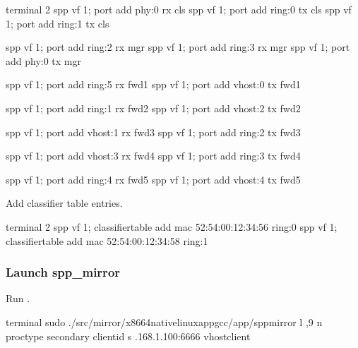 \documentclass[a4paper,11pt,openany,oneside,english]{sphinxmanual}
\begin{document}
\begin{sphinxVerbatim}[commandchars=\\\{\},formatcom=\footnotesize]
\PYGZsh{} terminal 2
spp \PYGZgt{} vf 1; port add phy:0 rx cls
spp \PYGZgt{} vf 1; port add ring:0 tx cls
spp \PYGZgt{} vf 1; port add ring:1 tx cls

spp \PYGZgt{} vf 1; port add ring:2 rx mgr
spp \PYGZgt{} vf 1; port add ring:3 rx mgr
spp \PYGZgt{} vf 1; port add phy:0 tx mgr

spp \PYGZgt{} vf 1; port add ring:5 rx fwd1
spp \PYGZgt{} vf 1; port add vhost:0 tx fwd1

spp \PYGZgt{} vf 1; port add ring:1 rx fwd2
spp \PYGZgt{} vf 1; port add vhost:2 tx fwd2

spp \PYGZgt{} vf 1; port add vhost:1 rx fwd3
spp \PYGZgt{} vf 1; port add ring:2 tx fwd3

spp \PYGZgt{} vf 1; port add vhost:3 rx fwd4
spp \PYGZgt{} vf 1; port add ring:3 tx fwd4

spp \PYGZgt{} vf 1; port add ring:4 rx fwd5
spp \PYGZgt{} vf 1; port add vhost:4 tx fwd5
\end{sphinxVerbatim}

Add classifier table entries.

\begin{sphinxVerbatim}[commandchars=\\\{\},formatcom=\footnotesize]
\PYGZsh{} terminal 2
spp \PYGZgt{} vf 1; classifier\PYGZus{}table add mac 52:54:00:12:34:56 ring:0
spp \PYGZgt{} vf 1; classifier\PYGZus{}table add mac 52:54:00:12:34:58 ring:1
\end{sphinxVerbatim}


\subsubsection{Launch spp\_mirror}
\label{\detokenize{usecases/spp_mirror:id2}}
Run .

\begin{sphinxVerbatim}[commandchars=\\\{\},formatcom=\footnotesize]
 terminal 
 sudo ./src/mirror/x86\PYGZus{}64\PYGZhy{}native\PYGZhy{}linuxapp\PYGZhy{}gcc/app/spp\PYGZus{}mirror 
  \PYGZhy{}l ,9 
  \PYGZhy{}n  \PYGZhy{}\PYGZhy{}proc\PYGZhy{}type secondary 
  \PYGZhy{}\PYGZhy{} 
  \PYGZhy{}\PYGZhy{}client\PYGZhy{}id  
  \PYGZhy{}s .168.1.100:6666 
  \PYGZhy{}\PYGZhy{}vhost\PYGZhy{}client
\end{sphinxVerbatim}
\end{document}
